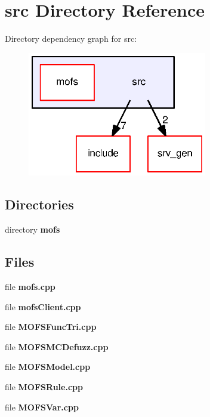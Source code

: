\section{src Directory Reference}
\label{dir_68267d1309a1af8e8297ef4c3efbcdba}
Directory dependency graph for src\-:\nopagebreak
\begin{figure}[H]
\begin{center}
\leavevmode
\includegraphics[width=222pt]{dir_68267d1309a1af8e8297ef4c3efbcdba_dep}
\end{center}
\end{figure}
\subsection*{Directories}
\begin{DoxyCompactItemize}
\item 
directory {\bf mofs}
\end{DoxyCompactItemize}
\subsection*{Files}
\begin{DoxyCompactItemize}
\item 
file {\bf mofs.\-cpp}
\item 
file {\bf mofs\-Client.\-cpp}
\item 
file {\bf M\-O\-F\-S\-Func\-Tri.\-cpp}
\item 
file {\bf M\-O\-F\-S\-M\-C\-Defuzz.\-cpp}
\item 
file {\bf M\-O\-F\-S\-Model.\-cpp}
\item 
file {\bf M\-O\-F\-S\-Rule.\-cpp}
\item 
file {\bf M\-O\-F\-S\-Var.\-cpp}
\end{DoxyCompactItemize}
